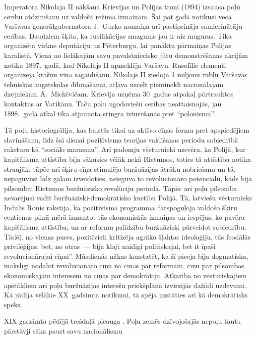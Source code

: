 \documentclass[twoside,a5paper,12pt,fleqn,openany]{extbook}
\begin{document}
Imperatora Nikolaja II nākšana Krievijas un Polijas tronī (1894) izsauca poļu cerību atdzimšanu uz valdošā režīma izmaiņām. Šai pat gadā notikusī vecā Varšavas ģenerālgubernatora J.~Gurko nomaiņa arī pastiprināja samierinātāju cerības. Daudziem šķita, ka rusifikācijas smagums jau ir aiz muguras. Tika organizēta virkne deputāciju uz Pēterburgu, lai panāktu pārmaiņas Polijas karalistē. Viena no lielākajām savu pavalstniecisko jūtu demonstrēšanas akcijām notika 1897.~gadā, kad Nikolajs II apmeklēja Varšavu. Rusofīlie elementi organizēja krāšņu viņa sagaidīšanu. Nikolajs II ziedoja 1 miljonu rubļu Varšavas tehniskās augstskolas dibināšanai, atļāva uzcelt pieminekli nacionālajam dzejniekam Ā.~Mickēvičam. Krievija uzņēma 30~gadus atpakaļ pārtrauktos kontaktus ar Vatikānu. Taču poļu ugodoviešu cerības neattaisnojās, jau 1898.~gadā atkal tika atjaunota stingra izturēšanās pret ``polonismu''.

Tā poļu historiogrāfija, kas balstās tikai uz aktīvo cīņas formu pret apspiedējiem slavināšanu, līdz šai dienai pozitīvisma teorijas valdīšanas periodu sabiedrībā raksturo kā ``sociālo marasmu''. Arī padomju vēsturnieki uzsvēra, ka Polijā, kur kapitālisma attīstība bija sākusies vēlāk nekā Rietumos, toties tā attīstība notika straujāk, tāpēc arī šķiru cīņa stimulēja buržuāzijas ātrāku nobriešanu un tā, nepaguvusi līdz galam izveidoties, neieguva to revolucionāro potenciālu, kāds bija pilsonībai Rietumos buržuāzisko revolūciju periodā. Tāpēc arī poļu pilsonība nevarējusi vadīt buržuāziski-demokrātisko kustību Polijā. Tā, latviešu vēsturnieks Indulis Ronis rakstīja, ka pozitīvisma programma ``atspoguļoja valdošo šķiru centienus pilnā mērā izmantot tās ekonomiskās izmaiņas un iespējas, ko pavēra kapitālisma attīstība, un ar reformu palīdzību buržuāziski pārveidot sabiedrību. Tādēļ, no vienas puses, pozitīvisti kritizēja agrāko šļahtas ideoloģiju, tās feodālās privilēģijas, bet, no otras~--- bija klaji naidīgi politiskajai, bet it īpaši revolucionārajai cīņai''. Mūsdienās nākas konstatēt, ka šī pieeja bija dogmatiska, mākslīgi nodalot revolucionāro cīņu no cīņas par reformām, cīņu par pilsonības ekonomiskajām interesēm no cīņas par demokrātiju. Atkarībā no vēsturiskajiem apstākļiem arī poļu buržuāzijas interešu priekšplānā izvirzījās dažādi uzdevumi. Kā rādīja vēlākie XX~gadsimta notikumi, tā spēja uzstāties arī kā demokrātisks spēks.

XIX gadsimta pēdējā trešdaļā pieauga . Poļu zemēs dzīvojošajās nepoļu tautu pārstāvji sāka paust savu nacionālismu
\end{document}
